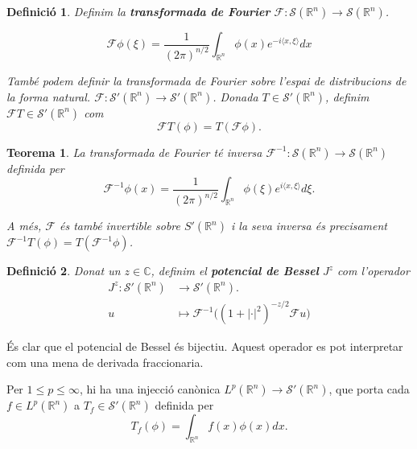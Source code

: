 \documentclass{article}
\numberwithin{equation}{section}
\newtheorem{teorema}{Teorema}[section]
\newtheorem{definicio}{Definici\'{o}}[section]
\begin{document}
\begin{definicio}
Definim la \textbf{transformada de Fourier} $\mathcal{F}:\mathcal{S}(\mathbb{R}^n)\rightarrow\mathcal{S}(\mathbb{R}^n)$.

\begin{equation}
\mathcal{F}\phi(\xi)=\frac{1}{(2\pi)^{n/2}}\int_{\mathbb{R}^n}\phi(x)e^{-i\langle x,\xi\rangle}dx
\end{equation}

Tamb\'{e} podem definir la transformada de Fourier sobre l'espai de distribucions de la forma natural. $\mathcal{F}:\mathcal{S}'(\mathbb{R}^n)\rightarrow\mathcal{S}'(\mathbb{R}^n)$. Donada $T\in\mathcal{S}'(\mathbb{R}^n)$, definim $\mathcal{F}T\in\mathcal{S}'(\mathbb{R}^n)$ com
\[\mathcal{F}T(\phi)=T(\mathcal{F}\phi).\]
\end{definicio}

\begin{teorema}
La transformada de Fourier t\'{e} inversa $\mathcal{F}^{-1}:\mathcal{S}(\mathbb{R}^n)\rightarrow\mathcal{S}(\mathbb{R}^n)$ definida per
\begin{equation}
\mathcal{F}^{-1}\phi(x)=\frac{1}{(2\pi)^{n/2}}\int_{\mathbb{R}^n}\phi(\xi)e^{i\langle x,\xi\rangle}d\xi.
\end{equation}

A m\'{e}s, $\mathcal{F}$ \'{e}s tamb\'{e} invertible sobre $S'(\mathbb{R}^n)$ i la seva inversa \'{e}s precisament $\mathcal{F}^{-1}T(\phi)=T(\mathcal{F}^{-1}\phi)$.
\end{teorema}

\begin{definicio}
Donat un $z\in\mathbb{C}$, definim el \textbf{potencial de Bessel} $J^z$ com l'operador
\begin{equation}
\begin{split}
J^z:\mathcal{S}'(\mathbb{R}^n)&\longrightarrow\mathcal{S}'(\mathbb{R}^n).\\
u&\longmapsto\mathcal{F}^{-1}\big((1+|\cdot|^2)^{-z/2}\mathcal{F}u\big)
\end{split}
\end{equation}
\end{definicio}

\'{E}s clar que el potencial de Bessel \'{e}s bijectiu. Aquest operador es pot interpretar com una mena de derivada fraccionaria.

Per $1\leq p\leq\infty$, hi ha una injecci\'{o} can\`{o}nica $L^p(\mathbb{R}^n)\rightarrow\mathcal{S}'(\mathbb{R}^n)$, que porta cada $f\in L^p(\mathbb{R}^n)$ a $T_f\in\mathcal{S}'(\mathbb{R}^n)$ definida per
\begin{equation}
T_f(\phi)=\int_{\mathbb{R}^n}f(x)\phi(x)dx.
\end{equation}
\end{document}

